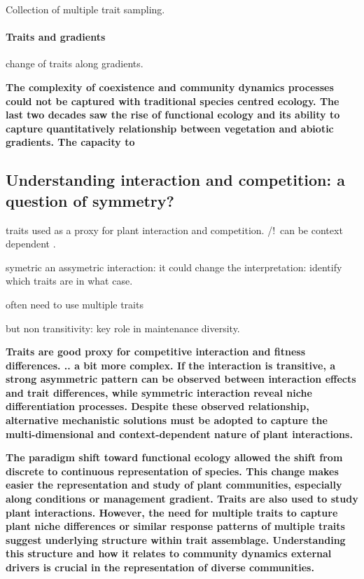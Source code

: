 Collection of multiple trait sampling.

\paragraph{Traits and gradients}
change of traits along gradients.


\textbf{The complexity of coexistence and community dynamics processes could not be captured with traditional species centred ecology. The last two decades saw the rise of functional ecology and its ability to capture quantitatively relationship between vegetation and abiotic gradients. The capacity to }

\subsection{Understanding interaction and competition: a question of symmetry?}

traits used as a proxy for plant interaction and competition. /!\ can be context dependent \parencite{gallaway_2003}.

symetric an assymetric interaction: it could change the interpretation: identify which traits are in what case.


\parencite{kraft_functional_2008}
often need to use multiple traits \parencite{kraft_plant_2015}

\parencite{kunstler	}


but non transitivity: key role in maintenance diversity.

\textbf{Traits are good proxy for competitive interaction and fitness differences. .. a bit more complex. If the interaction is transitive, a strong asymmetric pattern can be observed between interaction effects and trait differences, while symmetric interaction reveal niche differentiation processes. Despite these observed relationship, alternative mechanistic solutions must be adopted to capture the multi-dimensional and context-dependent nature of plant interactions.}


\textbf{The paradigm shift toward functional ecology allowed the shift from discrete to continuous representation of species. This change makes easier the representation and study of plant communities, especially along conditions or management gradient. Traits are also used to study plant interactions. However, the need for multiple traits to capture plant niche differences or similar response patterns of multiple traits suggest underlying structure within trait assemblage. Understanding this structure and how it relates to community dynamics external drivers is crucial in the representation of diverse communities.} 

